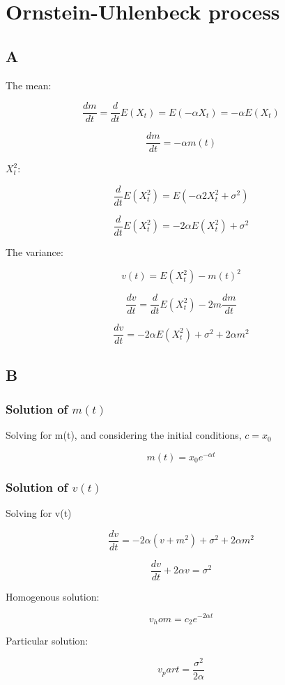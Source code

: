 \documentclass{article}
\begin{document}
\section{Ornstein-Uhlenbeck process}

\subsection{A}

The mean:

$$\frac{dm}{dt} = \frac{d}{dt}E(X_t) = E(-\alpha X_t) = -\alpha E(X_t)$$

$$\frac{dm}{dt} = -\alpha m(t)$$

$X_t^2$:

$$\frac{d}{dt}E(X_t^2) = E(- \alpha 2X_t^2 + \sigma^2)$$

$$\frac{d}{dt}E(X_t^2) = -2 \alpha E(X_t^2) + \sigma^2$$

The variance:

$$v(t) = E(X_t^2) -m(t)^2$$

$$\frac{dv}{dt} = \frac{d}{dt}E(X_t^2) - 2m\frac{dm}{dt}$$

$$\frac{dv}{dt} = -2 \alpha E(X_t^2) + \sigma^2 + 2 \alpha m^2$$

\subsection{B}

\subsubsection{Solution of $m(t)$}

Solving for m(t), and considering the initial conditions, $c=x_0$

$$m(t) = x_0 e^{-\alpha t}$$

\subsubsection{Solution of $v(t)$}

Solving for v(t)

$$\frac{dv}{dt} = -2 \alpha (v + m^2) + \sigma^2 + 2 \alpha m^2$$

$$\frac{dv}{dt} +  2 \alpha v = \sigma^2$$

Homogenous solution:

$$v_hom = c_2 e^{-2 \alpha t}$$

Particular solution:

$$v_part = \frac{\sigma^2}{2 \alpha}$$
\end{document}
